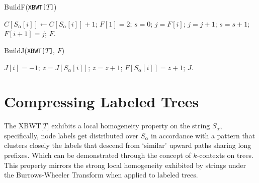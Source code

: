 \begin{algorithm}[H]
    \caption{BuildF(\texttt{XBWT[$T$]})}
    \label{alg:buildF}
    \begin{algorithmic}[1]
        \State $C[S_\alpha[i]] \gets C[S_\alpha[i]] + 1$; 
    \EndFor
    \State $F[1] = 2$; 
     
        \State $s = 0$; $j = F[i]$;
         
            \State $j = j + 1$;
             
                \State $s = s + 1$;
            \EndIf
        \EndWhile
        \State $F[i+1] = j$;
    \EndFor
    \State \Return $F$.
    \end{algorithmic}
\end{algorithm}
    
\begin{algorithm}[H]
    \caption{BuildJ(\texttt{XBWT[$T$]}, $F$)}
    \begin{algorithmic}[1]
            \State $J[i] = -1$; 
        \Else
            \State $z = J[S_\alpha[i]]$;
             
                \State $z = z + 1$;
            \EndWhile
            \State $F[S_\alpha[i]] = z + 1$;
        \EndIf
    \EndFor
    \State \Return $J$.
    \end{algorithmic}
\end{algorithm}

\section{Compressing Labeled Trees}

The XBWT[$T$] exhibits a local homogeneity property on the string $S_{\alpha}$, specifically, node labels get distributed over $S_{\alpha}$ in accordance with a pattern that clusters closely the labels that descend from `similar' upward paths sharing long prefixes. Which can be demonstrated through the concept of $k$-contexts on trees. 
This property mirrors the strong local homogeneity exhibited by strings under the Burrows-Wheeler Transform \cite{burrows1994block} when applied to labeled trees.

